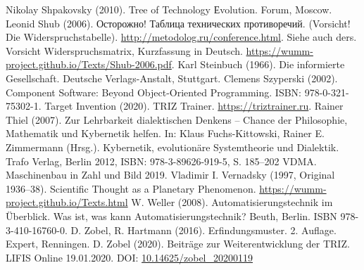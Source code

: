 \documentclass[11pt,a4paper]{article}
\begin{document}
\begin{thebibliography}{xxx}
 Nikolay Shpakovsky (2010).  Tree of Technology
  Еvolution. Forum, Moscow.
 Leonid Shub (2006). \foreignlanguage{russian}{Осторожно!
  Таблица технических противоречий}. (Vorsicht! Die Widerspruchstabelle).
  \url{http://metodolog.ru/conference.html}. Siehe auch ders. Vorsicht
  Widerspruchsmatrix, Kurzfassung in Deutsch.
  \url{https://wumm-project.github.io/Texts/Shub-2006.pdf}.
 Karl Steinbuch (1966). Die informierte Gesellschaft.
  Deutsche Verlags-Anstalt, Stuttgart.
 Clemens Szyperski (2002). Component Software: Beyond
  Object-Oriented Programming. ISBN: 978-0-321-75302-1.
 Target Invention (2020). TRIZ Trainer.
  \url{https://triztrainer.ru}.
 Rainer Thiel (2007). Zur Lehrbarkeit dialektischen Denkens
  – Chance der Philosophie, Mathematik und Kybernetik helfen. In: Klaus
  Fuchs-Kittowski, Rainer E. Zimmermann (Hrsg.). Kybernetik, evolutionäre
  Systemtheorie und Dialektik. Trafo Verlag, Berlin 2012, ISBN:
  978-3-89626-919-5, S. 185--202
 VDMA. Maschinenbau in Zahl und Bild 2019. 
 Vladimir I. Vernadsky (1997, Original 1936--38).
  Scientific Thought as a Planetary Phenomenon.
  \url{https://wumm-project.github.io/Texts.html}
 W. Weller (2008). Automatisierungstechnik im
  Überblick. Was ist, was kann Automatisierungstechnik? Beuth, Berlin. ISBN
  978-3-410-16760-0.
 D. Zobel, R. Hartmann (2016). Erfindungsmuster.
  2. Auflage.  Expert, Renningen.
 D. Zobel (2020). Beiträge zur Weiterentwicklung der TRIZ.
  LIFIS Online 19.01.2020. DOI: \url{10.14625/zobel_20200119}
\end{thebibliography}
\end{document}
